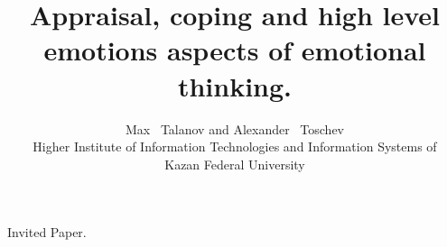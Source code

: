 \documentclass{apa6e}
\title{Appraisal, coping and high level emotions aspects of emotional thinking.}
\author{Max ~Talanov and Alexander ~Toschev\\Higher Institute of Information Technologies and Information Systems of \\Kazan Federal University}
\begin{document}
\begin{center}
Invited Paper.\\
\end{center} 
\maketitle


\end{document}
